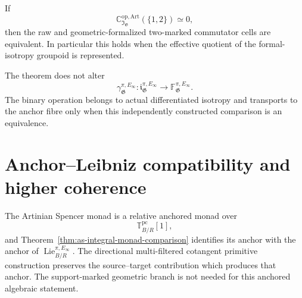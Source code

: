 \begin{corollary}
\label{cor:as-arity-two-discrepancy-zero}
If
\[
    \mathbb C_{\mathfrak I_{\mathfrak G}}^{\mathrm{op,Art}}
    (\{1,2\})
    \simeq0,
\]
then the raw and geometric-formalized two-marked commutator cells are
equivalent.  In particular this holds when the effective quotient of the
formal-isotropy groupoid is represented.
\end{corollary}

\begin{remark}
The theorem does not alter
\[
    \gamma_{\mathfrak G}^{\pi,E_\infty}:
    \mathfrak i_{\mathfrak G}^{\pi,E_\infty}
    \longrightarrow
    \mathbb F_{\mathfrak G}^{\pi,E_\infty}.
\]
The binary operation belongs to actual differentiated isotropy and transports
to the anchor fibre only when this independently constructed comparison is an
equivalence.
\end{remark}

\section{Anchor--Leibniz compatibility and higher coherence}
\label{sec:as-leibniz-jacobi}

\begin{theorem}
\label{thm:as-integral-leibniz}
The Artinian Spencer monad is a relative anchored monad over
\[
    \mathbb T_{B/R}^{\mathrm{pc}}[1],
\]
and
Theorem~\ref{thm:as-integral-monad-comparison} identifies its anchor with the
anchor of $\operatorname{Lie}^{\pi,E_\infty}_{B/R}$.  The directional
multi-filtered cotangent primitive construction preserves the source--target
contribution which produces that anchor.  The support-marked geometric branch
is not needed for this anchored algebraic statement.
\end{theorem}

